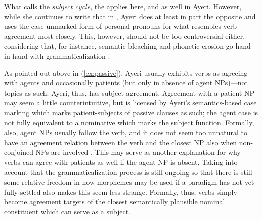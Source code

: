 What \citet{vangelderen2011} calls the \emph{subject cycle}, the
 applies here, and as well in
Ayeri. However, while she continues to write that in
, Ayeri does at least in
part the opposite and uses the case-unmarked form of personal pronouns for
what resembles verb agreement most closely. This, however, should not be too
controversial either, considering that, for instance, semantic bleaching and
phonetic erosion go hand in hand with grammaticalization 
\parencites[136--137]{lehmann2015}[497]{vangelderen2011}.

As pointed out above in (\ref{ex:passive}), Ayeri usually exhibits verbs as
agreeing with agents and occasionally patients (but only in absence of agent
NPs)---not topics as such. Ayeri, thus, has subject agreement. Agreement with a
patient NP may seem a little counterintuitive, but is licensed by Ayeri's
semantics-based case marking which marks patient-subjects of passive clauses as
such; the agent case is not fully equivalent to a nominative which marks the
subject function. Formally, also, agent NPs usually follow the verb, and it
does not seem too unnatural to have an agreement relation between the verb and
the closest NP also when non-conjoined NPs are involved
\citep[180]{corbett2006}. This may serve as another explanation for why verbs
can agree with patients as well if the agent NP is absent. Taking into account
that the grammaticalization process is still ongoing so that there is still
some relative freedom in how morphemes may be used if a paradigm has not yet
fully settled \citep[148--150]{lehmann2015} also makes this seem less strange.
Formally, thus, verbs simply become agreement targets of the closest
semantically plausible nominal constituent which can serve as a subject.

